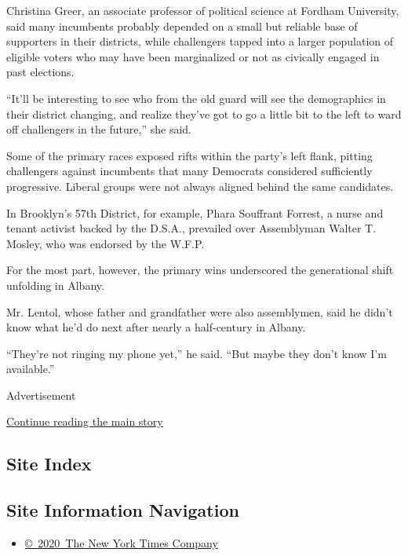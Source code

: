 Christina Greer, an associate professor of political science at Fordham
University, said many incumbents probably depended on a small but
reliable base of supporters in their districts, while challengers tapped
into a larger population of eligible voters who may have been
marginalized or not as civically engaged in past elections.

``It'll be interesting to see who from the old guard will see the
demographics in their district changing, and realize they've got to go a
little bit to the left to ward off challengers in the future,'' she
said.

Some of the primary races exposed rifts within the party's left flank,
pitting challengers against incumbents that many Democrats considered
sufficiently progressive. Liberal groups were not always aligned behind
the same candidates.

In Brooklyn's 57th District, for example, Phara Souffrant Forrest, a
nurse and tenant activist backed by the D.S.A., prevailed over
Assemblyman Walter T. Mosley, who was endorsed by the W.F.P.

For the most part, however, the primary wins underscored the
generational shift unfolding in Albany.

Mr. Lentol, whose father and grandfather were also assemblymen, said he
didn't know what he'd do next after nearly a half-century in Albany.

``They're not ringing my phone yet,'' he said. ``But maybe they don't
know I'm available.''

Advertisement

\protect\hyperlink{after-bottom}{Continue reading the main story}

\hypertarget{site-index}{%
\subsection{Site Index}\label{site-index}}

\hypertarget{site-information-navigation}{%
\subsection{Site Information
Navigation}\label{site-information-navigation}}

\begin{itemize}
\tightlist
\item
  \href{https://help.nytimes.com/hc/en-us/articles/115014792127-Copyright-notice}{©~2020~The
  New York Times Company}
\end{itemize}

